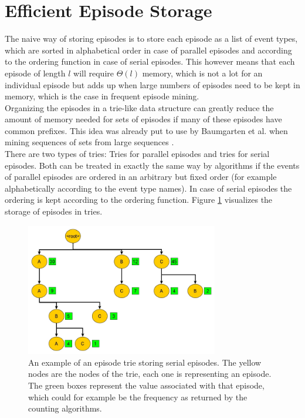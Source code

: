 \section{Efficient Episode Storage}
\label{sec_episodeTrie}
The naive way of storing episodes is to store each episode as a list of event types, which are sorted in alphabetical order in case of parallel episodes and according to the ordering function in case of serial episodes. This however means that each episode of length $l$ will require $\Theta(l)$ memory, which is not a lot for an individual episode but adds up when large numbers of episodes need to be kept in memory, which is the case in frequent episode mining. \\
Organizing the episodes in a trie-like data structure can greatly reduce the amount of memory needed for sets of episodes if many of these episodes have common prefixes. This idea was already put to use by Baumgarten et al. when mining sequences of sets from large sequences \cite{baumgarten2003tree}. \\
There are two types of tries: Tries for parallel episodes and tries for serial episodes. Both can be treated in exactly the same way by algorithms if the events of parallel episodes are ordered in an arbitrary but fixed order (for example alphabetically according to the event type names). In case of serial episodes the ordering is kept according to the ordering function. Figure \ref{fig_trieExample} visualizes the storage of episodes in tries. 
\begin{figure}[h]
	\centering
  	\includegraphics[width=0.75\textwidth]{trieExample}
	\caption{An example of an episode trie storing serial episodes. The yellow nodes are the nodes of the trie, each one is representing an episode. The green boxes represent the value associated with that episode, which could for example be the frequency as returned by the counting algorithms.}
	\label{fig_trieExample}
\end{figure}

